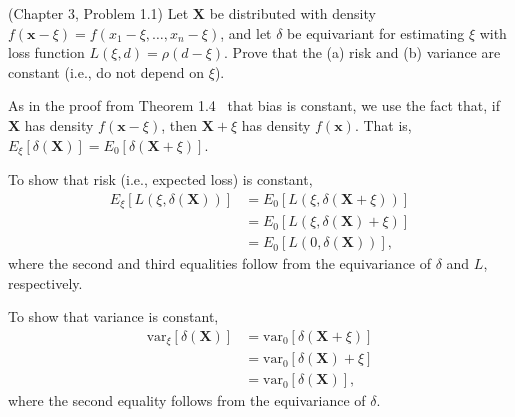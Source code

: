 \begin{question}
  (Chapter 3, Problem 1.1) Let \( \mathbf{X} \) be distributed with density \( f(\mathbf{x} - \xi) = f(x_1-\xi, \ldots, x_n-\xi) \), and let \( \delta \) be equivariant for estimating \( \xi \) with loss function \( L(\xi, d) = \rho(d - \xi) \). Prove that the (a) risk and (b) variance are constant (i.e., do not depend on \( \xi \)).
\end{question}

\begin{solution}
  As in the proof from Theorem 1.4~\cite[p.~150]{tpe} that bias is constant, we use the fact that, if \( \mathbf{X} \) has density \( f(\mathbf{x} - \xi) \), then \( \mathbf{X} + \xi \) has density \( f(\mathbf{x}) \). That is, \( E_\xi[\delta(\mathbf{X})] = E_0[\delta(\mathbf{X} + \xi)]\).

  To show that risk (i.e., expected loss) is constant,
  \[
    \begin{aligned}
      E_\xi[L(\xi, \delta(\mathbf{X}))]
       & = E_0[L(\xi, \delta(\mathbf{X} + \xi))] \\
       & = E_0[L(\xi, \delta(\mathbf{X}) + \xi)] \\
       & = E_0[L(0, \delta(\mathbf{X}))],
    \end{aligned}
  \]
  where the second and third equalities follow from the equivariance of \( \delta \) and \( L \), respectively.

  To show that variance is constant,
  \[
    \begin{aligned}
      \mathrm{var}_\xi[\delta(\mathbf{X})]
       & = \mathrm{var}_0[\delta(\mathbf{X} + \xi)] \\
       & = \mathrm{var}_0[\delta(\mathbf{X}) + \xi] \\
       & = \mathrm{var}_0[\delta(\mathbf{X})],
    \end{aligned}
  \]
  where the second equality follows from the equivariance of \( \delta \).
\end{solution}